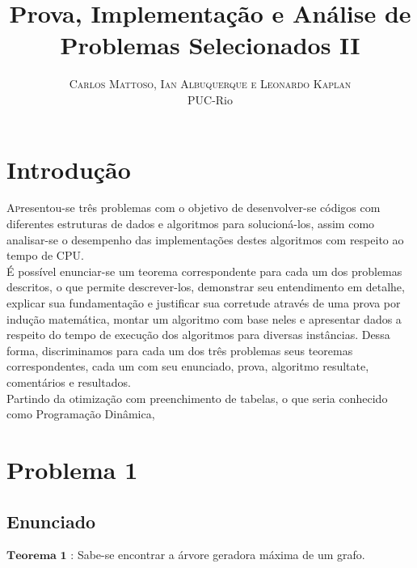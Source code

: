 \documentclass[twoside]{article}
\title{\vspace{-15mm}\fontsize{24pt}{10pt}\selectfont\textbf{Prova, Implementação e Análise de Problemas Selecionados II}} %
\author{
\large
\textsc{Carlos Mattoso, Ian Albuquerque e Leonardo Kaplan}\\[2mm] %
\normalsize PUC-Rio \\ %
}
\date{}
\begin{document}
\maketitle %

\thispagestyle{fancy} %



\begin{multicols}{2} %

\section{Introdução}

\lettrine[nindent=0em,lines=3]{A}presentou-se três problemas com o objetivo de desenvolver-se códigos com diferentes estruturas de dados e algoritmos para solucioná-los, assim como analisar-se o desempenho das implementações destes algoritmos com respeito ao tempo de CPU.\\

É possível enunciar-se um teorema correspondente para cada um dos problemas descritos, o que permite descrever-los, demonstrar seu entendimento em detalhe, explicar sua fundamentação e justificar sua corretude através de uma prova por indução matemática, montar um algoritmo com base neles e apresentar dados a respeito do tempo de execução dos algoritmos para diversas instâncias. Dessa forma, discriminamos para cada um dos três problemas seus teoremas correspondentes, cada um com seu enunciado, prova,  algoritmo resultate, comentários e resultados.\\

Partindo da otimização com preenchimento de tabelas, o que seria conhecido como Programação Dinâmica, 

\newpage
\section{Problema 1}

\subsection{ Enunciado }
\indent  $\mathbf{Teorema}$ $\mathbf{1}$ : Sabe-se encontrar a árvore geradora máxima de um grafo.


\end{multicols}
\end{document}
